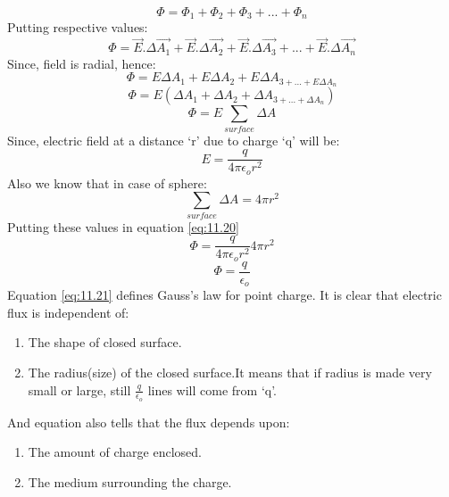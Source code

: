 \begin{equation}
  \Phi =  \Phi_{1}+ \Phi_{2}+ \Phi_{3}+...+ \Phi_{n} \nonumber
\end{equation}
Putting respective values:
\begin{equation}
  \Phi = \vec{E}.\Delta \vec{A_{1}}+\vec{E}.\Delta \vec{A_{2}} +\vec{E}.\Delta \vec{A_{3}}+...+\vec{E}.\Delta \vec{A_{n}} \nonumber
\end{equation}
Since, field is radial, hence:
\begin{equation}
  \Phi = E\Delta A_{1} + E\Delta A_{2} + E\Delta A_{3+...+E\Delta A_{n}} \nonumber
\end{equation}
\begin{equation}
  \Phi = E(\Delta A_{1} + \Delta A_{2} + \Delta A_{3+...+\Delta A_{n}}) \nonumber
\end{equation}
\begin{equation}\label{eq:11.20}
  \Phi = E\sum_{surface} \Delta A 
\end{equation}
Since, electric field at a distance ‘r’ due to charge ‘q’ will be:
\begin{equation}
  E = \frac{q}{4\pi\epsilon_{o}r^{2}} \nonumber
\end{equation}
Also we know that in case of sphere:
\begin{equation}
  \sum_{surface} \Delta A = 4\pi r^{2} \nonumber
\end{equation}
Putting these values in equation \ref{eq:11.20}
\begin{equation}
  \Phi = \frac{q}{4\pi\epsilon_{o}r^{2}} 4\pi r^{2} \nonumber
\end{equation}
\begin{equation}\label{eq:11.21}
  \Phi = \frac{q}{\epsilon_{o}}
\end{equation}
Equation \ref{eq:11.21} defines Gauss’s law for point charge. It is clear that electric flux is independent of:
\begin{enumerate}[label=(\roman*)] 
\item The shape of closed surface.
\item The radius(size) of the closed surface.It means that if radius
is made very small or large, still $\frac{q}{\epsilon_{o}}$ lines will come from ‘q’.
\end{enumerate}
And equation also tells that the flux depends upon:
\begin{enumerate}[label=(\roman*)]
\item The amount of charge enclosed.
\item The medium surrounding the charge.
\end{enumerate}

